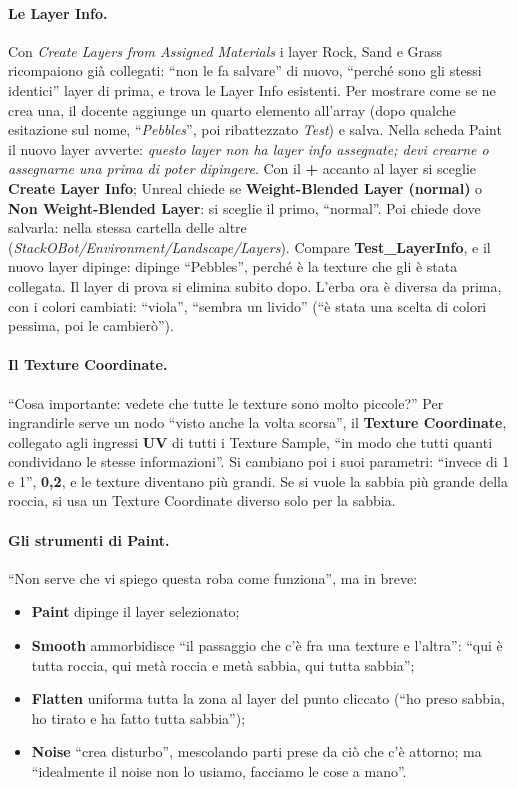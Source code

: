 \paragraph{Le Layer Info.} Con \emph{Create Layers from Assigned Materials} i layer Rock,
Sand e Grass ricompaiono già collegati: ``non le fa salvare'' di nuovo, ``perché sono gli
stessi identici'' layer di prima, e trova le Layer Info esistenti. Per mostrare come se ne
crea una, il docente aggiunge un quarto elemento all'array (dopo qualche esitazione sul
nome, ``\emph{Pebbles}'', poi ribattezzato \emph{Test}) e salva. Nella scheda Paint il nuovo
layer avverte: \emph{questo layer non ha layer info assegnate; devi crearne o assegnarne
una prima di poter dipingere}. Con il \textbf{+} accanto al layer si sceglie \textbf{Create
Layer Info}; Unreal chiede se \textbf{Weight-Blended Layer (normal)} o \textbf{Non
Weight-Blended Layer}: si sceglie il primo, ``normal''. Poi chiede dove salvarla: nella
stessa cartella delle altre (\emph{StackOBot/Environment/Landscape/Layers}). Compare
\textbf{Test\_LayerInfo}, e il nuovo layer dipinge: dipinge ``Pebbles'', perché è la texture
che gli è stata collegata. Il layer di prova si elimina subito dopo. L'erba ora è diversa
da prima, con i colori cambiati: ``viola'', ``sembra un livido'' (``è stata una scelta di
colori pessima, poi le cambierò'').

\paragraph{Il Texture Coordinate.} ``Cosa importante: vedete che tutte le texture sono molto
piccole?'' Per ingrandirle serve un nodo ``visto anche la volta scorsa'', il \textbf{Texture
Coordinate}, collegato agli ingressi \textbf{UV} di tutti i Texture Sample, ``in modo che
tutti quanti condividano le stesse informazioni''. Si cambiano poi i suoi parametri:
``invece di 1 e 1'', \textbf{0,2}, e le texture diventano più grandi. Se si vuole la sabbia
più grande della roccia, si usa un Texture Coordinate diverso solo per la sabbia.

\paragraph{Gli strumenti di Paint.} ``Non serve che vi spiego questa roba come funziona'', ma
in breve:
\begin{itemize}
  \item \textbf{Paint} dipinge il layer selezionato;
  \item \textbf{Smooth} ammorbidisce ``il passaggio che c'è fra una texture e l'altra'':
        ``qui è tutta roccia, qui metà roccia e metà sabbia, qui tutta sabbia'';
  \item \textbf{Flatten} uniforma tutta la zona al layer del punto cliccato (``ho preso
        sabbia, ho tirato e ha fatto tutta sabbia'');
  \item \textbf{Noise} ``crea disturbo'', mescolando parti prese da ciò che c'è attorno; ma
        ``idealmente il noise non lo usiamo, facciamo le cose a mano''.
\end{itemize}

